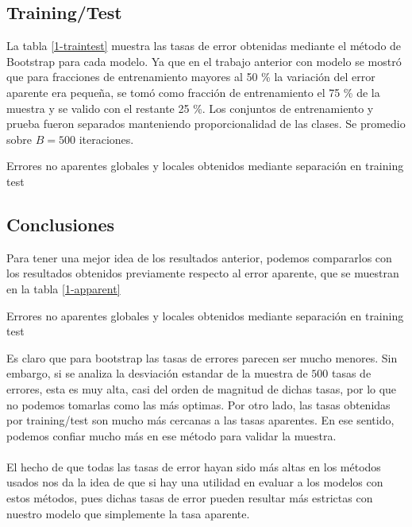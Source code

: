 \documentclass[11pt]{article}
\begin{document}
\subsection{Training/Test}
La tabla \ref{1-traintest} muestra las tasas de error obtenidas mediante el método de Bootstrap para cada modelo. Ya que en el trabajo anterior con modelo se mostró que para fracciones de entrenamiento mayores al 50 \% la variación del error aparente era pequeña, se tomó como fracción de entrenamiento el 75 \% de la muestra y se valido con el restante 25 \%. Los conjuntos de entrenamiento y prueba fueron separados manteniendo proporcionalidad de las clases. Se promedio sobre $B=500$ iteraciones.
\begin{table}[H]
    \centering
    
    \caption{Errores no aparentes globales y locales obtenidos mediante separación en training test }
    \label{1-traintest}
\end{table}
\subsection{Conclusiones}
Para tener una mejor idea de los resultados anterior, podemos compararlos con los resultados obtenidos previamente respecto al error aparente, que se muestran en la tabla \ref{1-apparent}
\begin{table}[H]
    \centering
    
    \caption{Errores no aparentes globales y locales obtenidos mediante separación en training test }
    \label{1-apparent}
\end{table}
Es claro que para bootstrap las tasas de errores parecen ser mucho menores. Sin embargo, si se analiza la desviación estandar de la muestra de $500$ tasas de errores, esta es muy alta, casi del orden de magnitud de dichas tasas, por lo que no podemos tomarlas como las más optimas. Por otro lado, las tasas obtenidas por training/test son mucho más cercanas a las tasas aparentes. En ese sentido, podemos confiar mucho más en ese método para validar la muestra. 
\\
\\El hecho de que todas las tasas de error hayan sido más altas en los métodos usados nos da la idea de que si hay una utilidad en evaluar a los modelos con estos métodos, pues dichas tasas de error pueden resultar más estrictas con nuestro modelo que simplemente la tasa aparente.
\end{document}
